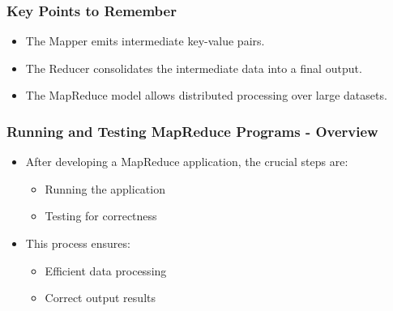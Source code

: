 \documentclass[aspectratio=169]{beamer}
\begin{document}
\begin{frame}[fragile]
    \frametitle{Key Points to Remember}
    \begin{itemize}
        \item The Mapper emits intermediate key-value pairs.
        \item The Reducer consolidates the intermediate data into a final output.
        \item The MapReduce model allows distributed processing over large datasets.
    \end{itemize}
\end{frame}

\begin{frame}[fragile]
    \frametitle{Running and Testing MapReduce Programs - Overview}
    \begin{itemize}
        \item After developing a MapReduce application, the crucial steps are:
        \begin{itemize}
            \item Running the application
            \item Testing for correctness
        \end{itemize}
        \item This process ensures:
        \begin{itemize}
            \item Efficient data processing
            \item Correct output results
        \end{itemize}
    \end{itemize}
\end{frame}
\end{document}
